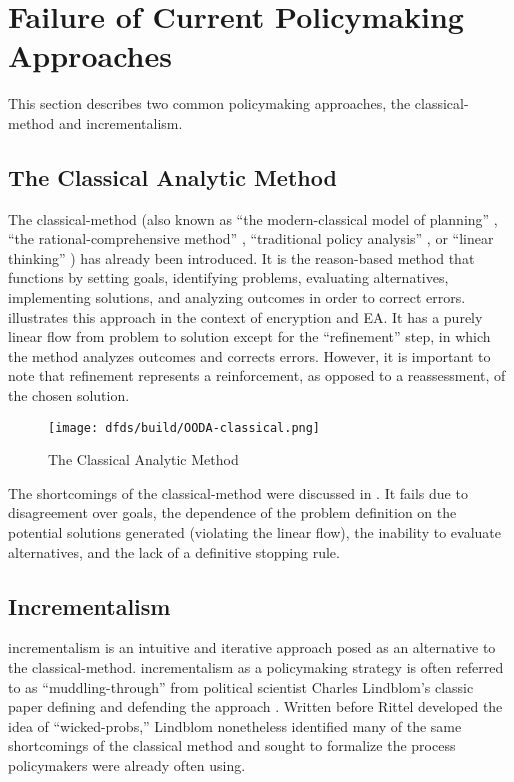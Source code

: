 \section{Failure of Current Policymaking Approaches}

This section describes two common policymaking approaches, the \ac{classical-method} and \ac{incrementalism}.

\subsection{The Classical Analytic Method}

The \ac{classical-method} \cite{feeley_judicial_2000} (also known as ``the modern-classical model of planning''
\cite{rittel_dilemmas_1973}, ``the rational-comprehensive method'' \cite{lindblom_muddling_1959}, ``traditional policy
analysis'' \cite{rozenshtein_wicked_2018}, or ``linear thinking'' \cite{commission_tackling_2018}) has already been
introduced. It is the reason-based method that functions by setting goals, identifying problems, evaluating
alternatives, implementing solutions, and analyzing outcomes in order to correct errors. 
illustrates this approach in the context of encryption and \ac{EA}. It has a purely linear flow from problem to solution
except for the ``refinement'' step, in which the method analyzes outcomes and corrects errors. However, it is important
to note that refinement represents a reinforcement, as opposed to a reassessment, of the chosen solution.

\begin{figure}[h]
  \centering\CaptionFontSize
  \texttt{[image: dfds/build/OODA-classical.png]}
  \caption{The Classical Analytic Method}
  \label{fig-classical-method}
\end{figure}

The shortcomings of the \ac{classical-method} were discussed in . It fails due to
disagreement over goals, the dependence of the problem definition on the potential solutions generated (violating the
linear flow), the inability to evaluate alternatives, and the lack of a definitive stopping rule.

\subsection{Incrementalism}

\Ac{incrementalism} is an intuitive and iterative approach posed as an alternative to the \ac{classical-method}.
\Ac{incrementalism} as a policymaking strategy is often referred to as ``\ac{muddling-through}'' from political
scientist Charles Lindblom's classic paper defining and defending the approach \cite{lindblom_muddling_1959}. Written
before Rittel developed the idea of ``\acp{wicked-prob},'' Lindblom nonetheless identified many of the same shortcomings
of the classical method and sought to formalize the process policymakers were already often using.

